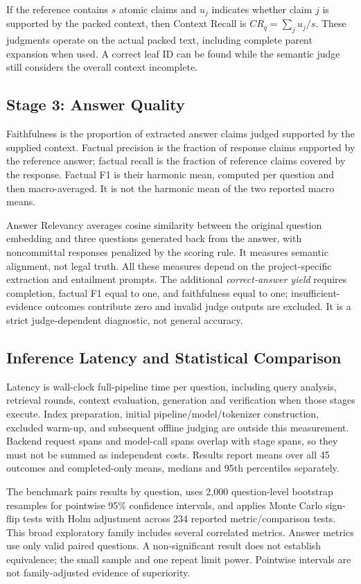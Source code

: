 \documentclass[11pt,a4paper,oneside]{report}
\begin{document}
If the reference contains $s$ atomic claims and $u_j$ indicates whether claim $j$ is supported by the packed context, then Context Recall is $CR_q=\sum_j u_j/s$. These judgments operate on the actual packed text, including complete parent expansion when used. A correct leaf ID can be found while the semantic judge still considers the overall context incomplete.

\subsection{Stage 3: Answer Quality}
Faithfulness is the proportion of extracted answer claims judged supported by the supplied context. Factual precision is the fraction of response claims supported by the reference answer; factual recall is the fraction of reference claims covered by the response. Factual F1 is their harmonic mean, computed per question and then macro-averaged. It is not the harmonic mean of the two reported macro means.

Answer Relevancy averages cosine similarity between the original question embedding and three questions generated back from the answer, with noncommittal responses penalized by the scoring rule. It measures semantic alignment, not legal truth. All these measures depend on the project-specific extraction and entailment prompts. The additional \textit{correct-answer yield} requires completion, factual F1 equal to one, and faithfulness equal to one; insufficient-evidence outcomes contribute zero and invalid judge outputs are excluded. It is a strict judge-dependent diagnostic, not general accuracy.

\subsection{Inference Latency and Statistical Comparison}
Latency is wall-clock full-pipeline time per question, including query analysis, retrieval rounds, context evaluation, generation and verification when those stages execute. Index preparation, initial pipeline/model/tokenizer construction, excluded warm-up, and subsequent offline judging are outside this measurement. Backend request spans and model-call spans overlap with stage spans, so they must not be summed as independent costs. Results report means over all 45 outcomes and completed-only means, medians and 95th percentiles separately.

The benchmark pairs results by question, uses 2,000 question-level bootstrap resamples for pointwise 95\% confidence intervals, and applies Monte Carlo sign-flip tests with Holm adjustment across 234 reported metric/comparison tests. This broad exploratory family includes several correlated metrics. Answer metrics use only valid paired questions. A non-significant result does not establish equivalence; the small sample and one repeat limit power. Pointwise intervals are not family-adjusted evidence of superiority.
\end{document}
